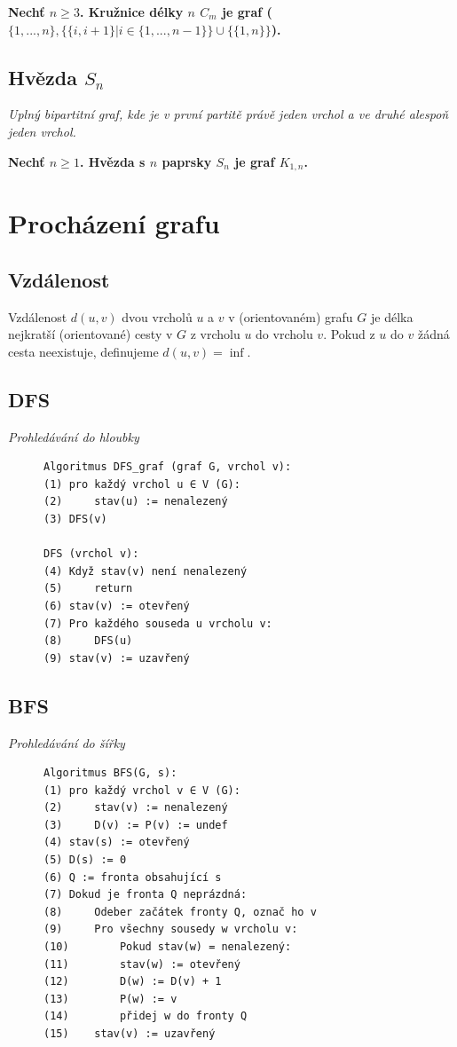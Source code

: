 \documentclass{szzclass}
\begin{document}
\textbf{Nechť $n \geq 3$.\newline
Kružnice délky $n$ $C_m$ je graf\newline
($\{1, . . . , n\}, \{\{i, i + 1\} | i \in \{1, . . . ,n-1\}\} \cup \{\{1, n\}\}$).
}

\subsection{Hvězda $S_n$}
\textit{Uplný bipartitní graf, kde je v první partitě právě jeden vrchol a ve druhé alespoň jeden vrchol.}

\textbf{Nechť $n \geq 1$.\newline
Hvězda s $n$ paprsky $S_n$ je graf $K_{1,n}$.
}


\section{Procházení grafu}

\subsection{Vzdálenost}
Vzdálenost $d(u, v)$ dvou vrcholů $u$ a $v$ v (orientovaném) grafu $G$ je
délka nejkratší (orientované) cesty v $G$ z vrcholu $u$ do vrcholu $v$.
Pokud z $u$ do $v$ žádná cesta neexistuje, definujeme $d(u, v) = \inf$.


\subsection{DFS}
\textit{Prohledávání do hloubky}

\begin{figure}[h!]
\begin{verbatim}
Algoritmus DFS_graf (graf G, vrchol v):
(1) pro každý vrchol u ∈ V (G):
(2)     stav(u) := nenalezený
(3) DFS(v)

DFS (vrchol v):
(4) Když stav(v) není nenalezený
(5)     return
(6) stav(v) := otevřený
(7) Pro každého souseda u vrcholu v:
(8)     DFS(u)
(9) stav(v) := uzavřený
\end{verbatim}
\end{figure}


\subsection{BFS}
\textit{Prohledávání do šířky}

\begin{figure}[h!]
\begin{verbatim}
Algoritmus BFS(G, s):
(1) pro každý vrchol v ∈ V (G):
(2)     stav(v) := nenalezený
(3)     D(v) := P(v) := undef
(4) stav(s) := otevřený
(5) D(s) := 0
(6) Q := fronta obsahující s
(7) Dokud je fronta Q neprázdná:
(8)     Odeber začátek fronty Q, označ ho v
(9)     Pro všechny sousedy w vrcholu v:
(10)        Pokud stav(w) = nenalezený:
(11)        stav(w) := otevřený
(12)        D(w) := D(v) + 1
(13)        P(w) := v
(14)        přidej w do fronty Q
(15)    stav(v) := uzavřený
\end{verbatim}
\end{figure}
\end{document}
